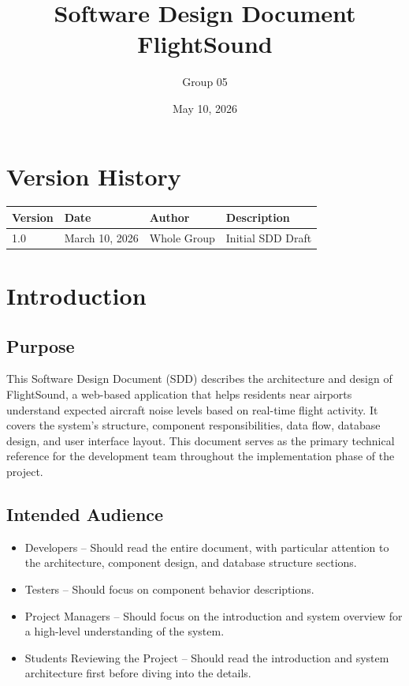 \documentclass[12pt]{article}
\title{Software Design Document\\FlightSound}
\author{Group 05}
\date{May 10, 2026}
\begin{document}
\maketitle
\newpage

\tableofcontents
\newpage

\section*{Version History}

\begin{tabular}{|l|l|l|l|}
\hline
Version & Date & Author & Description \\
\hline
1.0 & March 10, 2026 & Whole Group & Initial SDD Draft \\
\hline
\end{tabular}

\newpage

\section{Introduction}

\subsection{Purpose}
This Software Design Document (SDD) describes the architecture and design of FlightSound, a web-based application that helps residents near airports understand expected aircraft noise levels based on real-time flight activity. It covers the system's structure, component responsibilities, data flow, database design, and user interface layout. This document serves as the primary technical reference for the development team throughout the implementation phase of the project.

\subsection{Intended Audience}
\begin{itemize}
\item Developers -- Should read the entire document, with particular attention to the architecture, component design, and database structure sections.
\item Testers -- Should focus on component behavior descriptions.
\item Project Managers -- Should focus on the introduction and system overview for a high-level understanding of the system.
\item Students Reviewing the Project -- Should read the introduction and system architecture first before diving into the details.
\end{itemize}
\end{document}
